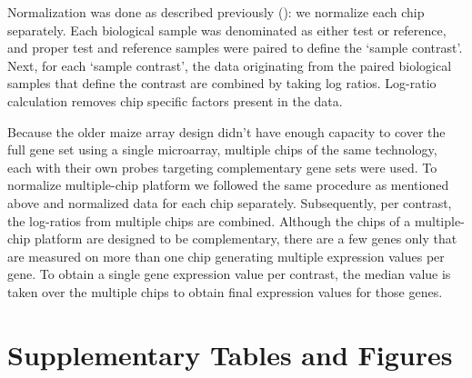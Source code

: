 Normalization was done as described previously (\cite{Engelen2011}): 
we normalize each chip separately.  Each biological sample
was denominated as either test or reference, and proper test and
reference samples were paired to define the ‘sample
contrast’. Next, for each ‘sample contrast’, the data originating
from the paired biological samples that define the contrast are
combined by taking log ratios. Log-ratio calculation removes chip
specific factors present in the data.

Because the older maize array design didn’t have enough capacity
to cover the full gene set using a single microarray, multiple
chips of the same technology, each with their own probes
targeting complementary gene sets were used. To normalize
multiple-chip platform we followed the same procedure as
mentioned above and normalized data for each chip
separately. Subsequently, per contrast, the log-ratios from
multiple chips are combined. Although the chips of a
multiple-chip platform are designed to be complementary, there
are a few genes only that are measured on more than one chip
generating multiple expression values per gene. To obtain a
single gene expression value per contrast, the median value is
taken over the multiple chips to obtain final expression values
for those genes.


\section{Supplementary Tables and Figures}






\cleardoublepage

